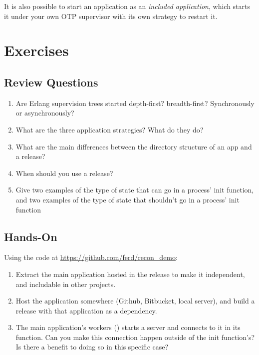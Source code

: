 It is also possible to start an application as an \emph{included application}, which starts it under your own OTP supervisor with its own strategy to restart it.

\section{Exercises}

\subsection*{Review Questions}

\begin{enumerate}
	\item  Are Erlang supervision trees started depth-first? breadth-first? Synchronously or asynchronously?
	\item What are the three application strategies? What do they do?
	\item What are the main differences between the directory structure of an app and a release?
	\item When should you use a release?
	\item Give two examples of the type of state that can go in a process' init function, and two examples of the type of state that shouldn't go in a process' init function
\end{enumerate}

\subsection*{Hands-On}

Using the code at \href{https://github.com/ferd/recon\_demo}{https://github.com/ferd/recon\_demo}:

\begin{enumerate}
	\item Extract the main application hosted in the release to make it independent, and includable in other projects.
	\item Host the application somewhere (Github, Bitbucket, local server), and build a release with that application as a dependency.
	\item The main application's workers () starts a server and connects to it in its  function. Can you make this connection happen outside of the init function's? Is there a benefit to doing so in this specific case?
\end{enumerate}

